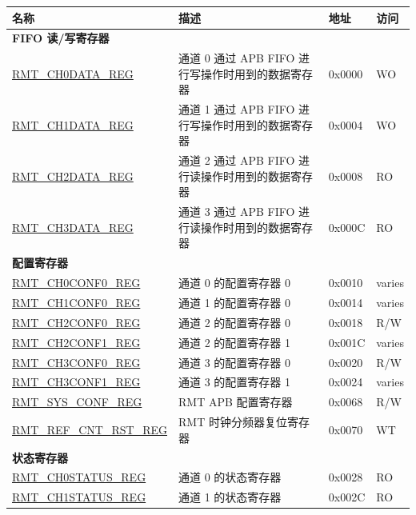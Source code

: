 \begin{longtable}{ | p{5.5cm} | p{6.8cm} | p{1.3cm} | p{1.5cm} | }
\hline\rowcolor{lightgray}
\textbf{名称} & \textbf{描述} & \textbf{地址} & \textbf{访问} \\ \hline
\endhead
\multicolumn{4}{|l|}{\textbf{FIFO 读/写寄存器}} \\ \hline
\hyperref[regdesc:RMTCHNDATAREG]{RMT\_CH0DATA\_REG} & 通道 0 通过 APB FIFO 进行写操作时用到的数据寄存器 & 0x0000 & WO \\ \hline
\hyperref[regdesc:RMTCHNDATAREG]{RMT\_CH1DATA\_REG} & 通道 1 通过 APB FIFO 进行写操作时用到的数据寄存器 & 0x0004 & WO \\ \hline
\hyperref[regdesc:RMTCHMDATAREG]{RMT\_CH2DATA\_REG} & 通道 2 通过 APB FIFO 进行读操作时用到的数据寄存器 & 0x0008 & RO \\ \hline
\hyperref[regdesc:RMTCHMDATAREG]{RMT\_CH3DATA\_REG} & 通道 3 通过 APB FIFO 进行读操作时用到的数据寄存器 & 0x000C & RO \\ \hline
\multicolumn{4}{|l|}{\textbf{配置寄存器}} \\ \hline
\hyperref[regdesc:RMTCHNCONF0REG]{RMT\_CH0CONF0\_REG} & 通道 0 的配置寄存器 0 & 0x0010 & varies \\ \hline
\hyperref[regdesc:RMTCHNCONF0REG]{RMT\_CH1CONF0\_REG} & 通道 1 的配置寄存器 0 & 0x0014 & varies \\ \hline
\hyperref[regdesc:RMTCHMCONF0REG]{RMT\_CH2CONF0\_REG} & 通道 2 的配置寄存器 0 & 0x0018 & R/W \\ \hline
\hyperref[regdesc:RMTCHMCONF1REG]{RMT\_CH2CONF1\_REG} & 通道 2 的配置寄存器 1 & 0x001C & varies \\ \hline
\hyperref[regdesc:RMTCHMCONF0REG]{RMT\_CH3CONF0\_REG} & 通道 3 的配置寄存器 0 & 0x0020 & R/W \\ \hline
\hyperref[regdesc:RMTCHMCONF1REG]{RMT\_CH3CONF1\_REG} & 通道 3 的配置寄存器 1 & 0x0024 & varies \\ \hline
\hyperref[regdesc:RMTSYSCONFREG]{RMT\_SYS\_CONF\_REG} & RMT APB 配置寄存器 & 0x0068 & R/W \\ \hline
\hyperref[regdesc:RMTREFCNTRSTREG]{RMT\_REF\_CNT\_RST\_REG} & RMT 时钟分频器复位寄存器 & 0x0070 & WT \\ \hline
\multicolumn{4}{|l|}{\textbf{状态寄存器}} \\ \hline
\hyperref[regdesc:RMTCHNSTATUSREG]{RMT\_CH0STATUS\_REG} & 通道 0 的状态寄存器 & 0x0028 & RO \\ \hline
\hyperref[regdesc:RMTCHNSTATUSREG]{RMT\_CH1STATUS\_REG} & 通道 1 的状态寄存器 & 0x002C & RO \\ \hline

\end{longtable}
